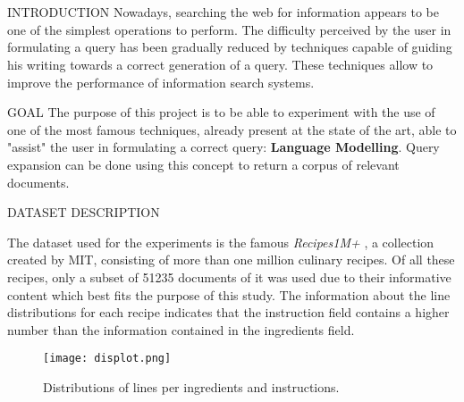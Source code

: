 \section{}

\begin{frame}{INTRODUCTION}
    Nowadays, searching the web for information appears to be one of the 
    simplest operations to perform. The difficulty perceived by the user in 
    formulating a query has been gradually reduced by techniques capable of 
    guiding his writing towards a correct generation of a query. These 
    techniques allow to improve the performance of information search 
    systems.
\end{frame}

\begin{frame}{GOAL}
    The purpose of this project is to be able to experiment with the use of 
    one of the most famous techniques, already present at the state of the 
    art, able to "assist" the user in formulating a correct query: {\bfseries Language 
    Modelling}. Query expansion can be done using this concept to return a 
    corpus of relevant documents. 
\end{frame}

\begin{frame}{DATASET DESCRIPTION}
    \begin{minipage}{\linewidth}
        \centering
        \begin{minipage}{0.45\linewidth}
            The dataset used for the experiments is the famous \emph{Recipes1M+} \footnotemark[1], a collection 
            created by MIT, consisting of more than one million culinary recipes. Of 
            all these recipes, only a subset of 51235 documents of it was used due to their 
            informative content which best fits the purpose of this study. The information 
            about the line distributions for each recipe indicates that the instruction 
            field contains a higher number than the information contained in the ingredients 
            field.
        \end{minipage}
        \hspace{0.05\linewidth}
        \begin{minipage}{0.47\linewidth}
            \begin{figure}[h!]
                \centering
                \texttt{[image: displot.png]}
                \centering
                \caption{Distributions of lines per ingredients and instructions.}
                \label{distributions}
            \end{figure}
        \end{minipage}
    \end{minipage}
\end{frame}

